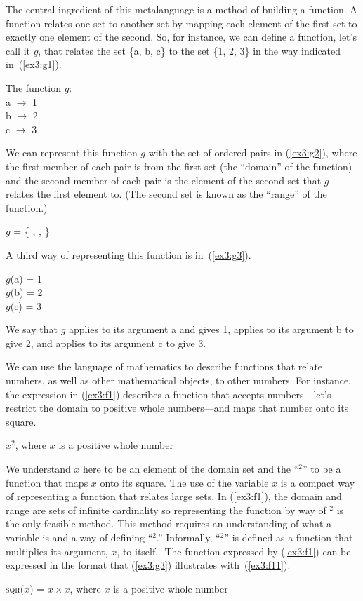 The central ingredient of this metalanguage is a method of building a function. A function relates one set to another set by mapping each element of the first set to exactly one element of the second. So, for instance, we can define a function, let's call it $g$, that relates the set \{a, b, c\} to the set \{1, 2, 3\} in the way indicated in~(\ref{ex3:g1}).
\begin{exe}
	\raggedright 
	\ex \label{ex3:g1} The function $g$:\\
	a $\rightarrow$ 1\\ b $\rightarrow$ 2\\ c $\rightarrow$ 3
\end{exe}
We can represent this function $g$ with the set of ordered pairs in (\ref{ex3:g2}), where the first member of each pair is from the first set (the ``domain'' of the function) and the second member of each pair is the element of the second set that $g$ relates the first element to. (The second set is known as the ``range'' of the function.)
\begin{exe}
	\raggedright
	\ex \label{ex3:g2} 
	$g$ = \{ , ,  \}
\end{exe}
A third way of representing this function is in~(\ref{ex3:g3}).
\begin{exe}
	\raggedright
	\ex \label{ex3:g3} 
	$g$(a) = 1\\ $g$(b) = 2\\ $g$(c) = 3
\end{exe}
We say that $g$ applies to its argument a and gives 1, applies to its argument b to give 2, and applies to its argument c to give 3. 

We can use the language of mathematics to describe functions that relate numbers, as well as other mathematical objects, to other numbers. For instance, the expression in (\ref{ex3:f1}) describes a function that accepts numbers---let's restrict the domain to positive whole numbers---and maps that number onto its square.
\begin{exe}
	\raggedright
	\ex \label{ex3:f1} 
	$x^2$, where $x$ is a positive whole number
\end{exe}
We understand $x$ here to be an element of the domain set and the ``$^2$'' to be a function that maps $x$ onto its square. The use of the variable $x$ is a compact way of representing a function that relates large sets. In (\ref{ex3:f1}), the domain and range are sets of infinite cardinality so representing the function by way of $^2$ is the only feasible method. This method requires an understanding of what a variable is and a way of defining ``$^2$.'' Informally, ``$^2$'' is defined as a function that multiplies its argument, $x$, to itself. %
$
$$
$
The function expressed by (\ref{ex3:f1}) can be expressed in the format that (\ref{ex3:g3}) illustrates with~(\ref{ex3:f11}).
\begin{exe}
\raggedright
	\ex \label{ex3:f11}
	\textsc{sqr}($x$) = $x \times x$, where $x$ is a positive whole number
\end{exe}

